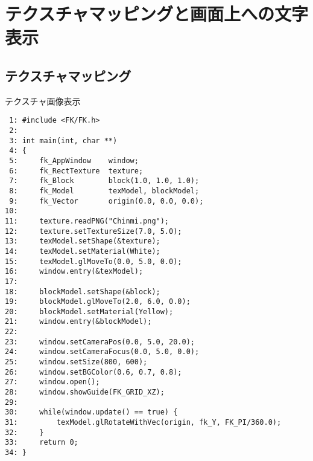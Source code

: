 \chapter{テクスチャマッピングと画面上への文字表示}
\section{テクスチャマッピング} \label{sec:08-texture}
\begin{itembox}[l]{テクスチャ画像表示}
\begin{small}
\begin{verbatim}
 1: #include <FK/FK.h>
 2: 
 3: int main(int, char **)
 4: {
 5:     fk_AppWindow    window;
 6:     fk_RectTexture  texture;
 7:     fk_Block        block(1.0, 1.0, 1.0);
 8:     fk_Model        texModel, blockModel;
 9:     fk_Vector       origin(0.0, 0.0, 0.0);
10: 
11:     texture.readPNG("Chinmi.png");
12:     texture.setTextureSize(7.0, 5.0);
13:     texModel.setShape(&texture);
14:     texModel.setMaterial(White);
15:     texModel.glMoveTo(0.0, 5.0, 0.0);
16:     window.entry(&texModel);
17: 
18:     blockModel.setShape(&block);
19:     blockModel.glMoveTo(2.0, 6.0, 0.0);
20:     blockModel.setMaterial(Yellow);
21:     window.entry(&blockModel);
22: 
23:     window.setCameraPos(0.0, 5.0, 20.0);
24:     window.setCameraFocus(0.0, 5.0, 0.0);
25:     window.setSize(800, 600);
26:     window.setBGColor(0.6, 0.7, 0.8);
27:     window.open();
28:     window.showGuide(FK_GRID_XZ);
29: 
30:     while(window.update() == true) {
31:         texModel.glRotateWithVec(origin, fk_Y, FK_PI/360.0);
32:     }
33:     return 0;
34: }
\end{verbatim}
\end{small}
\end{itembox}
